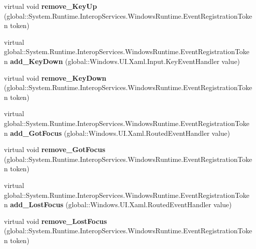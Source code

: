 \begin{DoxyCompactItemize}
virtual void {\bfseries remove\+\_\+\+Key\+Up} (global\+::\+System.\+Runtime.\+Interop\+Services.\+Windows\+Runtime.\+Event\+Registration\+Token token)
\item 
\mbox{\label{class_windows_1_1_u_i_1_1_xaml_1_1_u_i_element_a58b82f2b844e4c525c9caa9f4dea423b}} 
virtual global\+::\+System.\+Runtime.\+Interop\+Services.\+Windows\+Runtime.\+Event\+Registration\+Token {\bfseries add\+\_\+\+Key\+Down} (global\+::\+Windows.\+U\+I.\+Xaml.\+Input.\+Key\+Event\+Handler value)
\item 
\mbox{\label{class_windows_1_1_u_i_1_1_xaml_1_1_u_i_element_a20e6427c1bb47624dae8e067c2fcf806}} 
virtual void {\bfseries remove\+\_\+\+Key\+Down} (global\+::\+System.\+Runtime.\+Interop\+Services.\+Windows\+Runtime.\+Event\+Registration\+Token token)
\item 
\mbox{\label{class_windows_1_1_u_i_1_1_xaml_1_1_u_i_element_acf97b246d988b08971b2521c2500b00b}} 
virtual global\+::\+System.\+Runtime.\+Interop\+Services.\+Windows\+Runtime.\+Event\+Registration\+Token {\bfseries add\+\_\+\+Got\+Focus} (global\+::\+Windows.\+U\+I.\+Xaml.\+Routed\+Event\+Handler value)
\item 
\mbox{\label{class_windows_1_1_u_i_1_1_xaml_1_1_u_i_element_a969ce3d1998e0289e2292ad1e208096f}} 
virtual void {\bfseries remove\+\_\+\+Got\+Focus} (global\+::\+System.\+Runtime.\+Interop\+Services.\+Windows\+Runtime.\+Event\+Registration\+Token token)
\item 
\mbox{\label{class_windows_1_1_u_i_1_1_xaml_1_1_u_i_element_ac2967b5f0d4bd33c16e3b3b32e19b01a}} 
virtual global\+::\+System.\+Runtime.\+Interop\+Services.\+Windows\+Runtime.\+Event\+Registration\+Token {\bfseries add\+\_\+\+Lost\+Focus} (global\+::\+Windows.\+U\+I.\+Xaml.\+Routed\+Event\+Handler value)
\item 
\mbox{\label{class_windows_1_1_u_i_1_1_xaml_1_1_u_i_element_aea3d40de4ee0bc713def8655f7f7ccd3}} 
virtual void {\bfseries remove\+\_\+\+Lost\+Focus} (global\+::\+System.\+Runtime.\+Interop\+Services.\+Windows\+Runtime.\+Event\+Registration\+Token token)

\end{DoxyCompactItemize}
